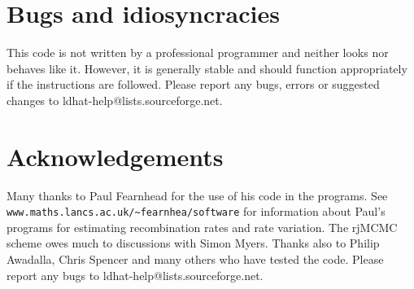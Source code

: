 \documentclass[a4paper,10pt,fullpage]{article}
\begin{document}
\section{Bugs and idiosyncracies}
This code is not written by a professional programmer and neither
looks nor behaves like it.  However, it is generally stable and
should function appropriately if the instructions are followed.
Please report any bugs, errors or suggested changes to
ldhat-help@lists.sourceforge.net.

\section{Acknowledgements}
Many thanks to Paul Fearnhead for the use of his code in the
programs.  See \verb+www.maths.lancs.ac.uk/~fearnhea/software+ for
information about Paul's programs for estimating recombination
rates and rate variation.   The rjMCMC scheme owes much to
discussions with Simon Myers.  Thanks also to Philip Awadalla,
Chris Spencer and many others who have tested the code. Please
report any bugs to ldhat-help@lists.sourceforge.net.
\newpage


\end{document}
